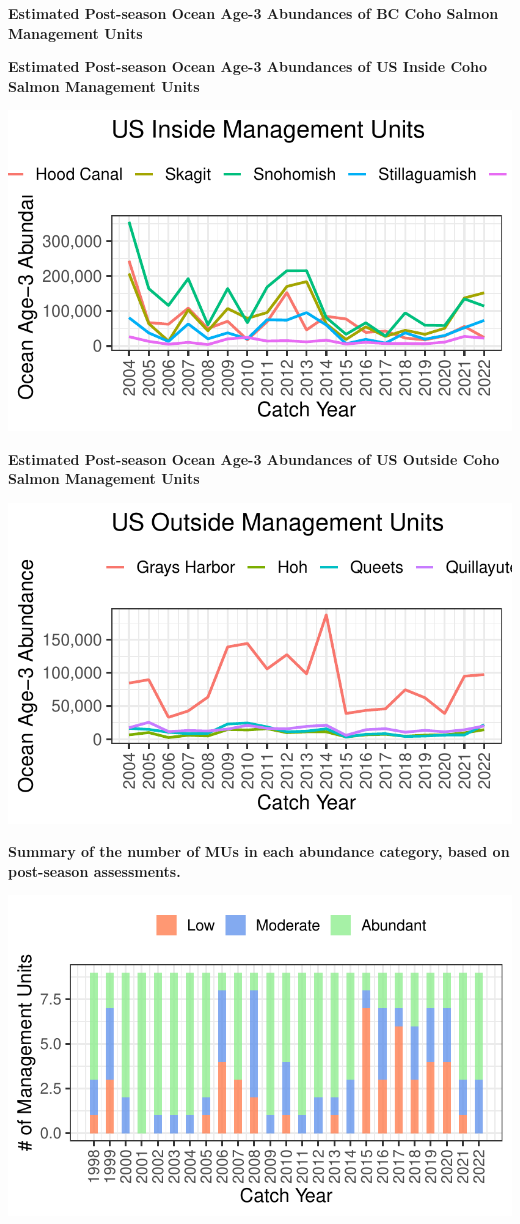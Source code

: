 \documentclass[
  letterpaper,
  DIV=11,
  numbers=noendperiod]{scrartcl}
\begin{document}
\textbf{Estimated Post-season Ocean Age-3 Abundances of BC Coho Salmon
Management Units}

\textbf{Estimated Post-season Ocean Age-3 Abundances of US Inside Coho
Salmon Management Units}

\includegraphics{index-5yr_files/figure-pdf/unnamed-chunk-2-1.pdf}

\textbf{Estimated Post-season Ocean Age-3 Abundances of US Outside Coho
Salmon Management Units}

\includegraphics{index-5yr_files/figure-pdf/unnamed-chunk-3-1.pdf}

\textbf{Summary of the number of MUs in each abundance category, based
on post-season assessments.}

\includegraphics{index-5yr_files/figure-pdf/unnamed-chunk-4-1.pdf}
\end{document}
